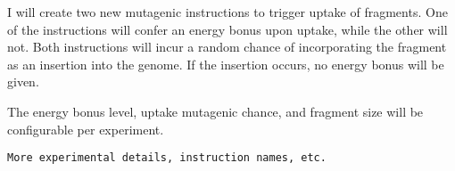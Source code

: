 I will create two new mutagenic instructions to trigger uptake of fragments. One of the instructions will confer an energy bonus upon uptake, while the other will not.  Both instructions will incur a random chance of incorporating the fragment as an insertion into the genome.  If the insertion occurs, no energy bonus will be given. 

The energy bonus level, uptake mutagenic chance, and fragment size will be configurable per experiment. 

\verb|More experimental details, instruction names, etc.|